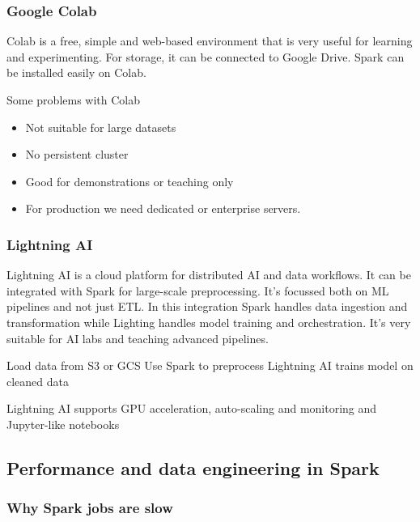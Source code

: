 \subsubsection{Google Colab}


Colab is a free, simple and web-based environment that is very useful for learning and experimenting. For storage, it can be connected to Google Drive. Spark can be installed easily on Colab.

\vspace{10pt}

Some problems with Colab
\begin{itemize}
    \item Not suitable for large datasets
    \item No persistent cluster
    \item Good for demonstrations or teaching only
    \item For production we need dedicated or enterprise servers.
\end{itemize}


\subsubsection{Lightning AI}

Lightning AI is a cloud platform for distributed AI and data workflows. It can be integrated with Spark for large-scale preprocessing. It's focussed both on ML pipelines and not just ETL. In this integration Spark handles data ingestion and transformation while Lighting handles model training and orchestration. It's very suitable for AI labs and teaching advanced pipelines. 

\vspace{10pt}

Load data from S3 or GCS \ra Use Spark to preprocess \ra Lightning AI trains model on cleaned data

\vspace{10pt}

Lightning AI supports GPU acceleration, auto-scaling and monitoring and Jupyter-like notebooks



\subsection{Performance and data engineering in Spark}

\subsubsection{Why Spark jobs are slow}

